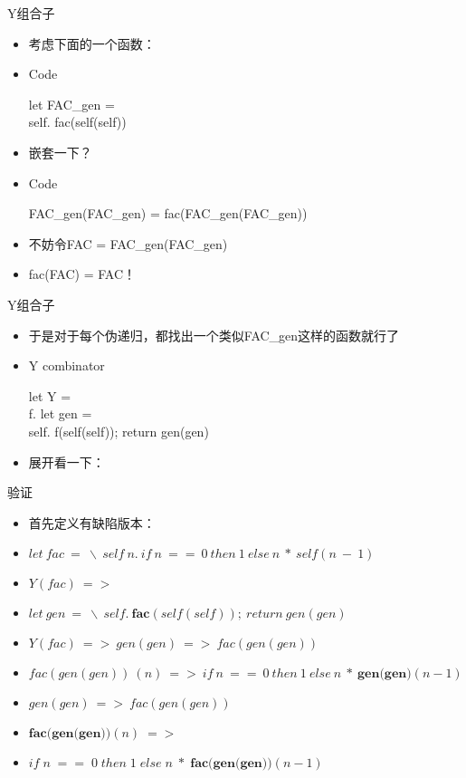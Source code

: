 \documentclass[xcolor=dvipsnames, 11pt]{beamer}
\newenvironment{codetext}{\begin{semiverbatim}\begin{footnotesize}}{\end{footnotesize}\end{semiverbatim}}
\newenvironment{code}{\begin{block}{Code}\begin{semiverbatim} \begin{footnotesize}}{\end{footnotesize}\end{semiverbatim}\end{block}}
\newenvironment{iit}{\begin{itemize}\setlength{\itemsep}{0.2cm}}{\end{itemize}}
\begin{document}
\begin{frame}[fragile]{Y组合子}
\begin{iit}
\item<2->考虑下面的一个函数：
\item<3->[]\begin{code}let FAC_gen = \\self. fac(self(self))
\end{code}
\item<4->嵌套一下？
\item<5->[]\begin{code}FAC_gen(FAC_gen) = fac(FAC_gen(FAC_gen))
\end{code}
\item<6->不妨令FAC = FAC\_gen(FAC\_gen)
\item<7->fac(FAC) = FAC！
\end{iit}
\end{frame}

\begin{frame}[fragile]{Y组合子}
\begin{iit}
\item<2->[]于是对于每个伪递归，都找出一个类似FAC\_gen这样的函数就行了
\item<3->[]\begin{exampleblock}{Y combinator}\begin{codetext}
	let Y = \\f. let gen = \\self. f(self(self)); return gen(gen)
\end{codetext}\end{exampleblock}
\item<4->[]展开看一下：
\end{iit}
\end{frame}

\begin{frame}[fragile]{验证}
\begin{iit}
\item<2->首先定义有缺陷版本：
\item<3->$let\ fac\ =\ \backslash\ self\ n.\ if\ n\ ==\ 0\ then\ 1\ else\ n\ *\ self(n\ -\ 1)$
\item<4->$Y(fac)\ =>$
\item<5->[]$let\ gen\ =\ \backslash\ self.\ \textbf{fac}(self(self));\ return\ gen(gen)$
\item<6->$Y(fac)\ =>\ gen(gen)\ =>\ fac(gen(gen))$
\item<7->$fac(gen(gen))\ (n)\ =>\ if\ n\ ==\ 0\ then\ 1\ else\ n\ *\ \textbf{gen(gen)}(n-1)$
\item<8->$gen(gen)\ =>\ fac(gen(gen))$
\item<9->$\textbf{fac(gen(gen))}(n)\;=>\;$
\item<10->[]$if\;n\;==\;0\;then\;1\;else\;n\;*\;\textbf{fac(gen(gen))}(n-1)$
\end{iit}
\end{frame}
\end{document}
